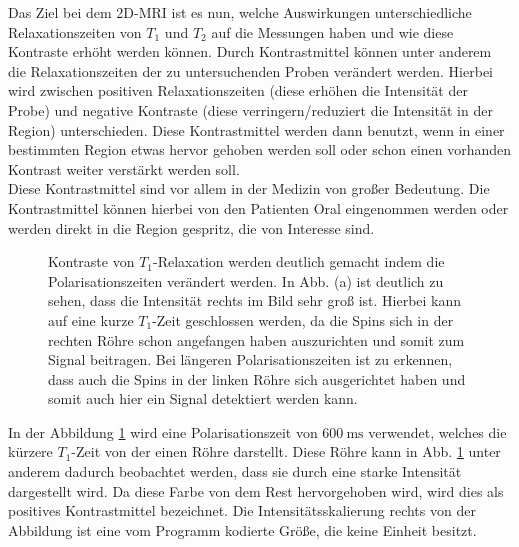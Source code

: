 Das Ziel bei dem 2D-MRI ist es nun, welche Auswirkungen unterschiedliche Relaxationszeiten von $T_1$ und $T_2$ auf die Messungen haben und wie diese Kontraste erhöht werden können. Durch Kontrastmittel können unter anderem die Relaxationszeiten der zu untersuchenden Proben verändert werden. Hierbei wird zwischen positiven Relaxationszeiten (diese erhöhen die Intensität der Probe) und negative Kontraste (diese verringern/reduziert die Intensität in der Region) unterschieden.  Diese Kontrastmittel werden dann benutzt, wenn in einer bestimmten Region etwas hervor gehoben werden soll oder schon einen vorhanden Kontrast weiter verstärkt werden soll. \\
Diese Kontrastmittel sind vor allem in der Medizin von großer Bedeutung. Die Kontrastmittel können hierbei von den Patienten Oral eingenommen werden oder werden direkt in die Region gespritz, die von Interesse sind.   
\begin{figure}[H]
\centering
{}
{}
{}
{}
\caption[Kontraste von $T_1$-Relaxation werden deutlich gemacht indem die Polarisationszeiten verändert werden]{Kontraste von $T_1$-Relaxation werden deutlich gemacht indem die Polarisationszeiten verändert werden. In Abb. (a) ist deutlich zu sehen, dass die Intensität rechts im Bild sehr groß ist. Hierbei kann auf eine kurze $T_1$-Zeit geschlossen werden, da die Spins sich in der rechten Röhre schon angefangen haben auszurichten und somit zum Signal beitragen. Bei längeren Polarisationszeiten ist zu erkennen, dass auch die Spins in der linken Röhre sich ausgerichtet haben und somit auch hier ein Signal detektiert werden kann. }\label{fig:11600}
\end{figure}
In der Abbildung \ref{fig:11600} wird eine Polarisationszeit von $\SI{600}{\milli\second}$ verwendet,
 welches die kürzere $T_1$-Zeit von der einen Röhre darstellt. Diese Röhre kann in Abb. \ref{fig:11600} unter anderem dadurch beobachtet werden,
dass sie durch eine starke Intensität dargestellt wird. Da diese Farbe von dem Rest hervorgehoben wird, wird dies als positives Kontrastmittel bezeichnet.
Die Intensitätsskalierung rechts von der Abbildung ist eine vom Programm kodierte Größe, die keine Einheit besitzt.\\

